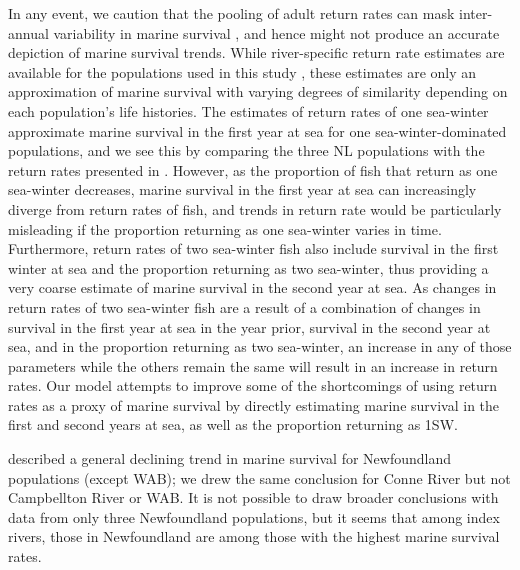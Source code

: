 \documentclass[12pt]{article}
\begin{document}
In any event, we caution that the pooling of adult return rates
\citep{Chaput2012a, Friedland1993,Gibson2016} can mask inter-annual
variability in marine survival \citep{Hubley2011}, and hence might not produce
an accurate depiction of marine survival trends.
While river-specific return rate estimates are available for the populations
used in this study \citep{ICES2019}, these estimates are only an approximation
of marine survival with varying degrees of similarity depending on each
population's life histories. The estimates of return rates of one sea-winter
approximate marine survival in the first year at sea for one
sea-winter-dominated populations, and we see this by comparing the three NL populations
with the return rates presented in \citet{ICES2019}. However, as the proportion of fish that
return as one sea-winter decreases, marine survival in the first year at sea
can increasingly diverge from return rates of fish, and trends in return rate
would be particularly misleading if the proportion returning as one sea-winter
varies in time. 
Furthermore, return rates of two sea-winter fish also include survival in the
first winter at sea and the proportion returning as two sea-winter, thus
providing a very coarse estimate of marine survival in the second year at sea. 
As changes in return rates of two sea-winter fish are a result of a
combination of changes in survival in the first year at sea in the year prior,
survival in the second year at sea, and in the proportion returning as two
sea-winter, an increase in any of those parameters while the others remain
the same will result in an increase in return rates. Our model attempts to
improve some of the shortcomings of using return rates as a proxy of marine
survival by directly estimating marine survival in the first and second years
at sea, as well as the proportion returning as 1SW.

\citet{Dempson2003} described a general declining trend in marine survival for
Newfoundland populations (except WAB); we drew the same conclusion for 
Conne River but not Campbellton River or WAB. It is not possible to draw broader conclusions
with data from only three Newfoundland populations, but it seems that among index rivers,
those in Newfoundland are among those with the highest marine survival rates.
\end{document}
